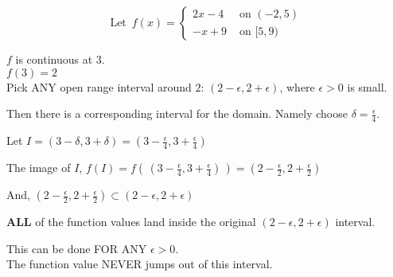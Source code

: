 \documentclass{ximera}
\begin{document}
\[
\text{Let } \, f(x) = 
\begin{cases}
  2x-4 & \text{ on } (-2, 5) \\
  -x + 9  & \text{ on } [5, 9)
\end{cases}
\]

$f$ is continuous at $3$. \\
$f(3)=2$ \\

Pick ANY open range interval around $2$:  $(2 - \epsilon, 2 + \epsilon)$, where $\epsilon > 0 $ is small. 

Then there is a corresponding interval for the domain. Namely choose $\delta = \frac{\epsilon}{4}$.

Let $I = (3 - \delta, 3 + \delta) = \left(3 - \frac{\epsilon}{4}, 3 + \frac{\epsilon}{4}\right)$


The image of $I$, $f(I) = f\left(\,\left(3 - \frac{\epsilon}{4}, 3 + \frac{\epsilon}{4}\right)\,\right) = \left(2 - \frac{\epsilon}{2}, 2 + \frac{\epsilon}{2}\right)$

And, $\left(2 - \frac{\epsilon}{2}, 2 + \frac{\epsilon}{2}\right) \subset  (2 - \epsilon, 2 + \epsilon) $


\textbf{ALL} of the function values land inside the original $(2 - \epsilon, 2 + \epsilon)$ interval.


This can be done FOR ANY $\epsilon > 0$. \\


The function value NEVER jumps out of this interval.
\end{document}
